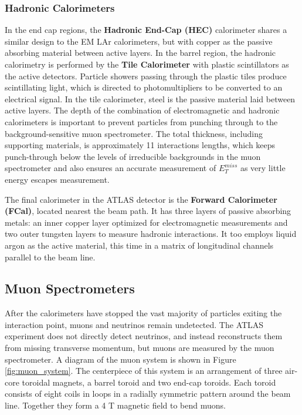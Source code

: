 \subsubsection{Hadronic Calorimeters}
In the end cap regions, the \textbf{Hadronic End-Cap (HEC)} calorimeter shares a similar design to the EM LAr calorimeters, but with copper as the passive absorbing material between active layers. In the barrel region, the hadronic calorimetry is performed by the \textbf{Tile Calorimeter} with plastic scintillators as the active detectors. Particle showers passing through the plastic tiles produce scintillating light, which is directed to photomultipliers to be converted to an electrical signal. In the tile calorimeter, steel is the passive material laid between active layers. The depth of the combination of electromagnetic and hadronic calorimeters is important to prevent particles from punching through to the background-sensitive muon spectrometer. The total thickness, including supporting materials, is approximately 11 interactions lengths, which keeps punch-through below the levels of irreducible backgrounds in the muon spectrometer and also ensures an accurate measurement of $E^{miss}_T$ as very little energy escapes measurement.

The final calorimeter in the ATLAS detector is the \textbf{Forward Calorimeter (FCal)}, located nearest the beam path. It has three layers of passive absorbing metals: an inner copper layer optimized for electromagnetic measurements and two outer tungsten layers to measure hadronic interactions. It too employs liquid argon as the active material, this time in a matrix of longitudinal channels parallel to the beam line.

\subsection{Muon Spectrometers}
After the calorimeters have stopped the vast majority of particles exiting the interaction point, muons and neutrinos remain undetected. The ATLAS experiment does not directly detect neutrinos, and instead reconstructs them from missing transverse momentum, but muons are measured by the muon spectrometer. A diagram of the muon system is shown in Figure \ref{fig:muon_system}. The centerpiece of this system is an arrangement of three air-core toroidal magnets, a barrel toroid and two end-cap toroids. Each toroid consists of eight coils in loops in a radially symmetric pattern around the beam line. Together they form a 4 T magnetic field to bend muons.

